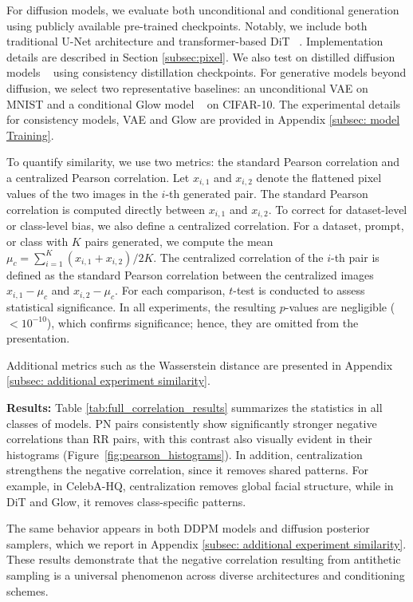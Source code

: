 \documentclass[12pt]{article}
\newcommand{\0}{\mathbf{0}}
\begin{document}
For diffusion models, we evaluate both unconditional and conditional generation using publicly available pre-trained checkpoints. Notably, we include both traditional U-Net architecture and transformer-based DiT ~\citep{peebles2023scalable}. Implementation details are described in Section \ref{subsec:pixel}.  We also test on distilled diffusion models  ~\citep{song2023consistency} using consistency distillation checkpoints.  For generative models beyond diffusion, we select two representative baselines: an unconditional VAE on MNIST and a conditional Glow model ~\citep{kingma2018glow} on CIFAR-10. The experimental details for consistency models, VAE and Glow are provided in Appendix \ref{subsec: model Training}.

To quantify similarity, we use two metrics: the standard Pearson correlation and a centralized Pearson correlation. Let $x_{i,1}$ and $x_{i,2}$ denote the flattened pixel values of the two images in the $i$-th generated pair. The standard Pearson correlation is computed directly between $x_{i,1}$ and $x_{i,2}$. To correct for dataset-level or class-level bias, we also define a centralized correlation. For  a dataset, prompt, or class with $K$ pairs generated, we compute the mean $\mu_c = \sum_{i=1}^{K}(x_{i,1}+x_{i,2})/2K$. The centralized correlation of the $i$-th pair is defined as the standard Pearson correlation between the centralized images $x_{i,1}-\mu_c$ and $x_{i,2}-\mu_c$.  For each comparison, $t$-test is conducted to assess statistical significance. In all experiments, the resulting $p$-values are negligible ($<10^{-10}$), which confirms significance; hence, they are omitted from the presentation.

Additional metrics such as the Wasserstein distance are presented in Appendix \ref{subsec: additional experiment similarity}.

\textbf{Results:} Table \ref{tab:full_correlation_results} summarizes the statistics in all classes of models.  PN pairs consistently show significantly stronger negative correlations than RR pairs, with this contrast also visually evident in their histograms (Figure~\ref{fig:pearson_histograms}). In addition, centralization strengthens the negative correlation, since it removes shared patterns. For example, in CelebA-HQ, centralization removes global facial structure, while in DiT and Glow, it removes class-specific patterns.

The same behavior appears in both DDPM models and diffusion posterior samplers, which we report in Appendix \ref{subsec: additional experiment similarity}. These results demonstrate that the negative correlation resulting from antithetic sampling is a universal phenomenon across diverse architectures and conditioning schemes.
\end{document}
